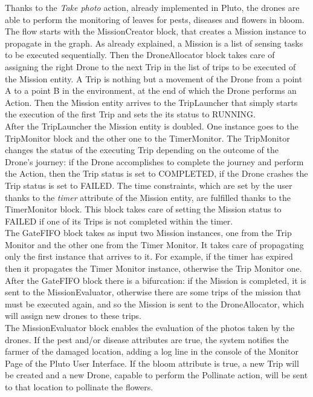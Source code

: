 \newpage 

Thanks to the \textit{Take photo} action, already implemented in Pluto, the drones are able to perform the monitoring of leaves for pests, diseases and flowers in bloom.
\\

The flow starts with the MissionCreator block, that creates a Mission instance to propagate in the graph.
As already explained, a Mission is a list of sensing tasks to be executed sequentially.
Then the DroneAllocator block takes care of assigning the right Drone to the next Trip in the list of trips to be executed of the Mission entity.
A Trip is nothing but a movement of the Drone from a point A to a point B in the environment, at the end of which the Drone performs an Action.
Then the Mission entity arrives to the TripLauncher that simply starts the execution of the first Trip and sets the its status to RUNNING.
\\

After the TripLauncher the Mission entity is doubled. One instance goes to the TripMonitor block and the other one to the TimerMonitor.
The TripMonitor changes the status of the executing Trip depending on the outcome of the Drone's journey:
if the Drone accomplishes to complete the journey and perform the Action, then the Trip status is set to COMPLETED,
if the Drone crashes the Trip status is set to FAILED.
The time constraints, which are set by the user thanks to the \textit{timer} attribute of the Mission entity, are fulfilled thanks to the TimerMonitor block.
This block takes care of setting the Mission status to FAILED if one of its Trips is not completed within the timer.
\\

The GateFIFO block takes as input two Mission instances, one from the Trip Monitor and the other one from the Timer Monitor.
It takes care of propagating only the first instance that arrives to it.
For example, if the timer has expired then it propagates the Timer Monitor instance, otherwise the Trip Monitor one.
\\

After the GateFIFO block there is a bifurcation:
if the Mission is completed, it is sent to the MissionEvaluator, otherwise there are some trips of the mission that must be executed again, and so the Mission is sent to the DroneAllocator, which will assign new drones to these trips.
\\

The MissionEvaluator block enables the evaluation of the photos taken by the drones. If the pest and/or disease attributes are true, the system notifies the farmer of the damaged location, adding a log line in the console of the Monitor Page of the Pluto User Interface.
If the bloom attribute is true, a new Trip will be created and a new Drone, capable to perform the Pollinate action, will be sent to that location to pollinate the flowers.
\\


